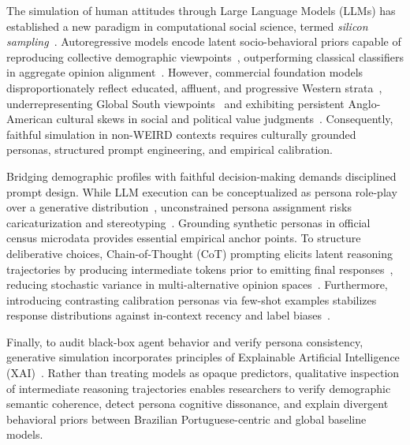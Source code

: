 The simulation of human attitudes through Large Language Models (LLMs) has
established a new paradigm in computational social science, termed
\textit{silicon sampling}~\cite{argyle_out_2023,filippas_large_2024}. Autoregressive
models encode latent socio-behavioral priors capable of reproducing collective
demographic viewpoints~\cite{argyle_out_2023,grossmann_ai_2023}, outperforming
classical classifiers in aggregate opinion alignment~\cite{miranda_simulating_2025}.
However, commercial foundation models disproportionately reflect educated, affluent,
and progressive Western strata~\cite{santurkar_whose_2023,bisbee_synthetic_2024},
underrepresenting Global South viewpoints~\cite{durmus_towards_2023} and
exhibiting persistent Anglo-American cultural skews in social and political value
judgments~\cite{hartmann_political_2023,masoud_cultural_2023,johnson_ghost_2022}.
Consequently, faithful simulation in non-WEIRD contexts requires culturally
grounded personas, structured prompt engineering, and empirical calibration.

Bridging demographic profiles with faithful decision-making demands disciplined
prompt design. While LLM execution can be conceptualized as persona role-play
over a generative distribution~\cite{shanahan_role_2023}, unconstrained persona
assignment risks caricaturization and stereotyping~\cite{deshpande_toxicity_2023,salewski_-context_2023}.
Grounding synthetic personas in official census microdata provides essential
empirical anchor points. To structure deliberative choices, Chain-of-Thought (CoT)
prompting elicits latent reasoning trajectories by producing intermediate tokens
prior to emitting final responses~\cite{wei_chain--thought_2022,kojima_large_2022},
reducing stochastic variance in multi-alternative opinion spaces~\cite{wang_self-consistency_2022}.
Furthermore, introducing contrasting calibration personas via few-shot examples
stabilizes response distributions against in-context recency and label
biases~\cite{brown_language_2020,zhao_calibrate_2021}.

Finally, to audit black-box agent behavior and verify persona consistency,
generative simulation incorporates principles of Explainable Artificial Intelligence
(XAI)~\cite{ribeiro_why_2016,guidotti_survey_2019}. Rather than treating models
as opaque predictors, qualitative inspection of intermediate reasoning
trajectories enables researchers to verify demographic semantic coherence,
detect persona cognitive dissonance, and explain divergent behavioral priors
between Brazilian Portuguese-centric and global baseline models.

